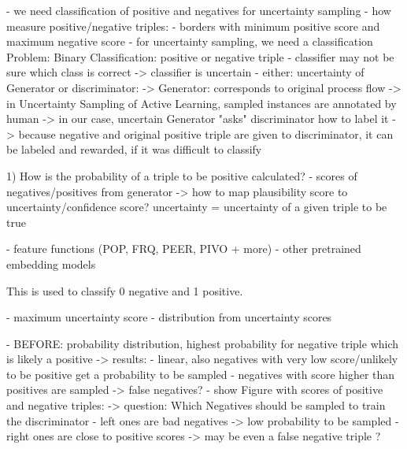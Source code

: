 - we need classification of positive and negatives for uncertainty sampling
- how measure positive/negative triples:
- borders with minimum positive score and maximum negative score
- for uncertainty sampling, we need a classification Problem: Binary Classification: positive or negative triple
- classifier may not be sure which class is correct -> classifier is uncertain
- either: uncertainty of Generator or discriminator:
-> Generator: corresponds to original process flow
-> in Uncertainty Sampling of Active Learning, sampled instances are annotated by human
-> in our case, uncertain Generator "asks" discriminator how to label it
-> because negative and original positive triple are given to discriminator, it can be labeled and rewarded, if it was difficult to classify

1) How is the probability of a triple to be positive calculated? 
- scores of negatives/positives from generator
-> how to map plausibility score to uncertainty/confidence score?
uncertainty = uncertainty of a given triple to be true

- feature functions (POP, FRQ, PEER, PIVO + more)
- other pretrained embedding models

This is used to classify 0 negative and 1 positive.




- maximum uncertainty score
- distribution from uncertainty scores











- BEFORE: probability distribution, highest probability for negative triple which is likely a positive
-> results: 
    - linear, also negatives with very low score/unlikely to be positive get a probability to be sampled 
    - negatives with score higher than positives are sampled -> false negatives?
- show Figure with scores of positive and negative triples:
-> question: Which Negatives should be sampled to train the discriminator
- left ones are bad negatives -> low probability to be sampled
- right ones are close to positive scores -> may be even a false negative triple ?

